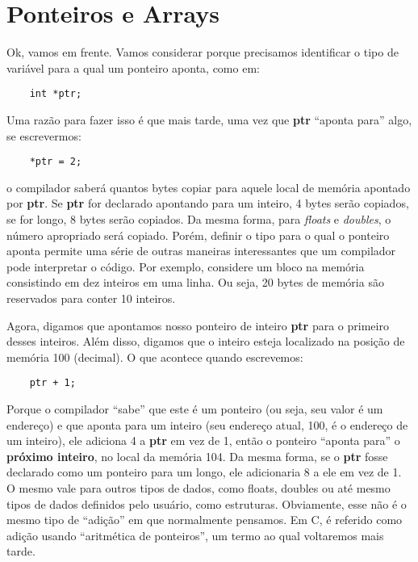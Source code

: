 
\chapter{Ponteiros e Arrays}
Ok, vamos em frente. Vamos considerar porque precisamos identificar o tipo de variável para a qual um ponteiro aponta, como em:
\begin{lstlisting}
	int *ptr;
\end{lstlisting}

Uma razão para fazer isso é que mais tarde, uma vez que \textbf{ptr} ``aponta para'' algo, se escrevermos:
\begin{lstlisting}
	*ptr = 2;
\end{lstlisting}
o compilador saberá quantos bytes copiar para aquele local de memória apontado por \textbf{ptr}. Se \textbf{ptr} for declarado apontando para um inteiro, 4 bytes serão copiados, se for longo, 8 bytes serão copiados. Da mesma forma, para \textit{floats} e \textit{doubles}, o número apropriado será copiado. Porém, definir o tipo para o qual o ponteiro aponta permite uma série de outras maneiras interessantes que um compilador pode interpretar o código. Por exemplo, considere um bloco na memória consistindo em dez inteiros em uma linha. Ou seja, 20 bytes de memória são reservados para conter 10 inteiros.

Agora, digamos que apontamos nosso ponteiro de inteiro \textbf{ptr} para o primeiro desses inteiros. Além disso, digamos que o inteiro esteja localizado na posição de memória 100 (decimal). O que acontece quando escrevemos:
\begin{lstlisting}
	ptr + 1;
\end{lstlisting}

Porque o compilador ``sabe'' que este é um ponteiro (ou seja, seu valor é um endereço) e que aponta para um inteiro (seu endereço atual, 100, é o endereço de um inteiro), ele adiciona 4 a \textbf{ptr} em vez de 1, então o ponteiro ``aponta para'' o \textbf{próximo inteiro}, no local da memória 104. Da mesma forma, se o \textbf{ptr} fosse declarado como um ponteiro para um longo, ele adicionaria 8 a ele em vez de 1.
O mesmo vale para outros tipos de dados, como floats, doubles ou até mesmo tipos de dados definidos pelo usuário, como estruturas. Obviamente, esse não é o mesmo tipo de ``adição'' em que normalmente pensamos. Em C, é referido como adição usando ``aritmética de ponteiros'', um termo ao qual voltaremos mais tarde.

